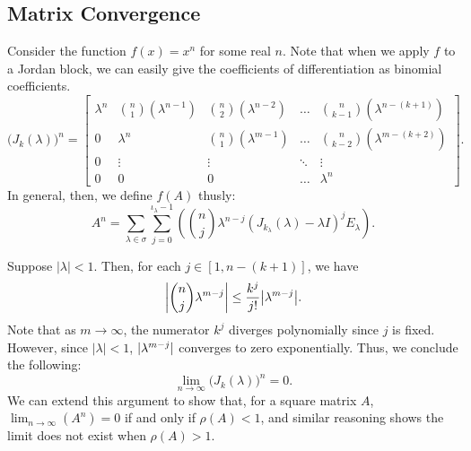 \documentclass[12pt]{article}
\newcommand{\parens}[1]{ \left( #1 \right) }
\DeclarePairedDelimiter{\abs}{\lvert}{\rvert}
\begin{document}
\subsection{Matrix Convergence}
Consider the function $f(x) = x^n$ for some real $n$. Note that when we apply
$f$ to a Jordan block, we can easily give the coefficients of differentiation as
binomial coefficients.
\begin{equation}\label{eq:power_jordan_block}
  \big( J_k(\lambda) \big)^n =
  \begin{bmatrix}
    \lambda^n & \binom{n}{1}(\lambda^{n-1}) & \binom{n}{2}(\lambda^{n-2}) & \ldots & \binom{n}{k-1}(\lambda^{n-(k+1)}) \\
    0 & \lambda^n & \binom{n}{1}(\lambda^{m-1}) & \ldots & \binom{n}{k-2}(\lambda^{m-(k+2)}) \\
    0 & \vdots & \vdots & \ddots & \vdots \\
    0 & 0 & 0 & \ldots & \lambda^n
  \end{bmatrix}.
\end{equation}
In general, then, we define $f(A)$ thusly:
\begin{equation}
  A^n = \sum_{\lambda \in \sigma}\sum_{j=0}^{\iota_{\lambda} - 1}\parens{ \binom{n}{j} \lambda^{n-j} (J_{k_\lambda}(\lambda) - \lambda I)^j E_{\lambda} }.
\end{equation}

Suppose $| \lambda | < 1$. Then, for each $j \in [1, n-(k+1)]$, we have
\begin{equation*}
  \abs*{\binom{n}{j}\lambda^{m-j}} \leq \frac{k^j}{j!}{\abs*{\lambda^{m-j}}}.
\end{equation*}
Note that as $m \to \infty$, the numerator $k^j$ diverges polynomially since $j$
is fixed. However, since $| \lambda | < 1$, $\abs{\lambda^{m-j}}$ converges to
zero exponentially. Thus, we conclude the following:
\begin{equation*}
  \lim_{n\to\infty}{\big( J_k(\lambda) \big)^n} = 0.
\end{equation*}
We can extend this argument to show that, for a square matrix $A$,
$\lim_{n\to\infty}{\parens{A^n}} = 0$ if and only if $\rho(A) < 1$, and similar
reasoning shows the limit does not exist when $\rho(A) > 1$.
\end{document}
